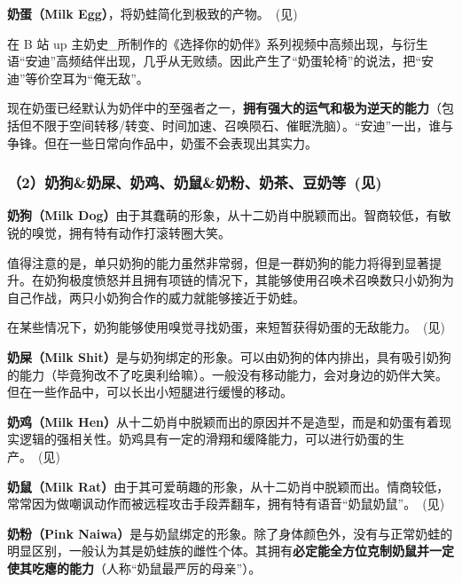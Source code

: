 

\textbf{奶蛋（Milk Egg）}，将奶蛙简化到极致的产物。~(见)

在 B 站 up 主奶史\_所制作的《选择你的奶伴》系列视频中高频出现，与衍生语“安迪”高频结伴出现，几乎从无败绩。因此产生了“奶蛋轮椅”的说法，把“安迪”等价空耳为“俺无敌”。

现在奶蛋已经默认为奶伴中的至强者之一，\textbf{拥有强大的运气和极为逆天的能力}（包括但不限于空间转移/转变、时间加速、召唤陨石、催眠洗脑）。“安迪”一出，谁与争锋。但在一些日常向作品中，奶蛋不会表现出其实力。

\subsubsection[（2）奶狗\&奶屎、奶鸡、奶鼠\&奶粉、奶茶、豆奶等]{（2）奶狗\&奶屎、奶鸡、奶鼠\&奶粉、奶茶、豆奶等~(见)}



\textbf{奶狗（Milk Dog）}由于其蠢萌的形象，从十二奶肖中脱颖而出。智商较低，有敏锐的嗅觉，拥有特有动作打滚转圈大笑。

值得注意的是，单只奶狗的能力虽然非常弱，但是一群奶狗的能力将得到显著提升。在奶狗极度愤怒并且拥有项链的情况下，其能够使用召唤术召唤数只小奶狗为自己作战，两只小奶狗合作的威力就能够接近于奶蛙。

\clearpage
在某些情况下，奶狗能够使用嗅觉寻找奶蛋，来短暂获得奶蛋的无敌能力。~(见)



\textbf{奶屎（Milk Shit）}是与奶狗绑定的形象。可以由奶狗的体内排出，具有吸引奶狗的能力（毕竟狗改不了吃奥利给嘛）。一般没有移动能力，会对身边的奶伴大笑。但在一些作品中，可以长出小短腿进行缓慢的移动。



\textbf{奶鸡（Milk Hen）}从十二奶肖中脱颖而出的原因并不是造型，而是和奶蛋有着现实逻辑的强相关性。奶鸡具有一定的滑翔和缓降能力，可以进行奶蛋的生产。~(见)



\textbf{奶鼠（Milk Rat）}由于其可爱萌趣的形象，从十二奶肖中脱颖而出。情商较低，常常因为做嘲讽动作而被远程攻击手段弄翻车，拥有特有语音“奶鼠奶鼠”。~(见)

\textbf{奶粉（Pink Naiwa）}是与奶鼠绑定的形象。除了身体颜色外，没有与正常奶蛙的明显区别，一般认为其是奶蛙族的雌性个体。其拥有\textbf{必定能全方位克制奶鼠并一定使其吃瘪的能力}（人称“奶鼠最严厉的母亲”）。

